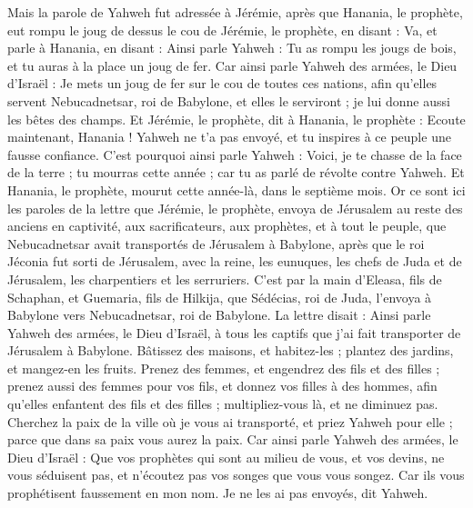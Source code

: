 \begin{multicols}{2}
Mais la parole de Yahweh fut adressée à Jérémie, après que Hanania, le prophète, eut rompu le joug de dessus le cou de Jérémie, le prophète, en disant :
Va, et parle à Hanania, en disant : Ainsi parle Yahweh : Tu as rompu les jougs de bois, et tu auras à la place un joug de fer.
Car ainsi parle Yahweh des armées, le Dieu d'Israël : Je mets un joug de fer sur le cou de toutes ces nations, afin qu'elles servent Nebucadnetsar, roi de Babylone, et elles le serviront ; je lui donne aussi les bêtes des champs.
Et Jérémie, le prophète, dit à Hanania, le prophète : Ecoute maintenant, Hanania ! Yahweh ne t'a pas envoyé, et tu inspires à ce peuple une fausse confiance.
C'est pourquoi ainsi parle Yahweh : Voici, je te chasse de la face de la terre ; tu mourras cette année ; car tu as parlé de révolte contre Yahweh.
Et Hanania, le prophète, mourut cette année-là, dans le septième mois.
\VerseOne{}Or ce sont ici les paroles de la lettre que Jérémie, le prophète, envoya de Jérusalem au reste des anciens en captivité, aux sacrificateurs, aux prophètes, et à tout le peuple, que Nebucadnetsar avait transportés de Jérusalem à Babylone,
après que le roi Jéconia fut sorti de Jérusalem, avec la reine, les eunuques, les chefs de Juda et de Jérusalem, les charpentiers et les serruriers.
C'est par la main d'Eleasa, fils de Schaphan, et Guemaria, fils de Hilkija, que Sédécias, roi de Juda, l'envoya à Babylone vers Nebucadnetsar, roi de Babylone. La lettre disait :
Ainsi parle Yahweh des armées, le Dieu d'Israël, à tous les captifs que j'ai fait transporter de Jérusalem à Babylone.
Bâtissez des maisons, et habitez-les ; plantez des jardins, et mangez-en les fruits.
Prenez des femmes, et engendrez des fils et des filles ; prenez aussi des femmes pour vos fils, et donnez vos filles à des hommes, afin qu'elles enfantent des fils et des filles ; multipliez-vous là, et ne diminuez pas.
Cherchez la paix de la ville où je vous ai transporté, et priez Yahweh pour elle ; parce que dans sa paix vous aurez la paix.
Car ainsi parle Yahweh des armées, le Dieu d'Israël : Que vos prophètes qui sont au milieu de vous, et vos devins, ne vous séduisent pas, et n'écoutez pas vos songes que vous vous songez.
Car ils vous prophétisent faussement en mon nom. Je ne les ai pas envoyés, dit Yahweh.

\end{multicols}
